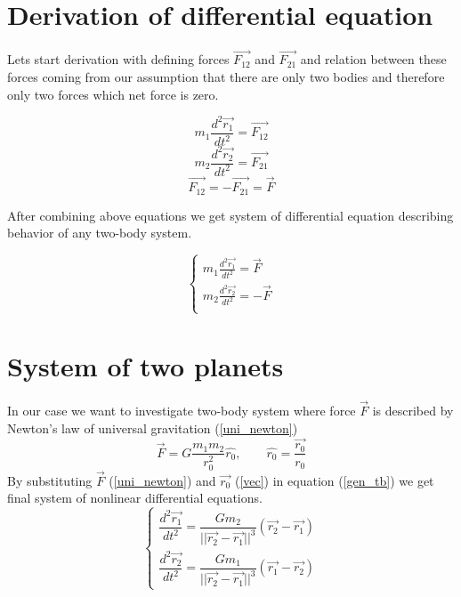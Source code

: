 \documentclass[english,12pt,a4paper, notitlepage]{report}
\begin{document}
	\section{Derivation of differential equation}
	
	Lets start derivation with defining forces $\vec{F_{12}}$ and $\vec{F_{21}}$ and relation between these forces coming from our assumption that there are only two bodies and therefore only two forces which net force is zero.
		
	\begin{equation}\label{ef1}
		m_1 \frac{d^2\vec{r_1}}{dt^2} = \vec{F_{12}}
	\end{equation}
	\begin{equation}\label{ef2}
		m_2 \frac{d^2\vec{r_2}}{dt^2} = \vec{F_{21}}
	\end{equation}
	\begin{equation}\label{ef3}
		\vec{F_{12}} = - \vec{F_{21}} = \vec{F}
	\end{equation}
	
	After combining above equations we get system of differential equation describing behavior of any two-body system.
	
	\begin{equation}\label{gen_tb}
		\begin{cases}
			m_1 \frac{d^2\vec{r_1}}{dt^2} = \vec{F} \\
			m_2 \frac{d^2\vec{r_2}}{dt^2} = - \vec{F} \\
		\end{cases}
	\end{equation}
	
	
	\section{System of two planets}
	In our case we want to investigate two-body system where force $\vec{F}$ is described by Newton's law of universal gravitation (\ref{uni_newton})
	\begin{equation}\label{uni_newton}
		\vec{F} = G \frac{m_1 m_2}{r_0^2}\hat{r_0}, \qquad \hat{r_0} = \frac{\vec{r_0}}{r_0}
	\end{equation}
	By substituting $\vec{F}$ (\ref{uni_newton}) and $\vec{r_0}$ (\ref{vec}) in equation (\ref{gen_tb}) we get final system of nonlinear differential equations.
	\begin{equation}
		\begin{cases}
			\dfrac{d^2\vec{r_1}}{dt^2} =  \dfrac{G m_2}{||\vec{r_2} - \vec{r_1}||^3} (\vec{r_2} - \vec{r_1})\\
			\dfrac{d^2\vec{r_2}}{dt^2} =  \dfrac{G m_1}{||\vec{r_2} - \vec{r_1}||^3} (\vec{r_1} - \vec{r_2})
		\end{cases}
	\end{equation}	
	
\end{document}
